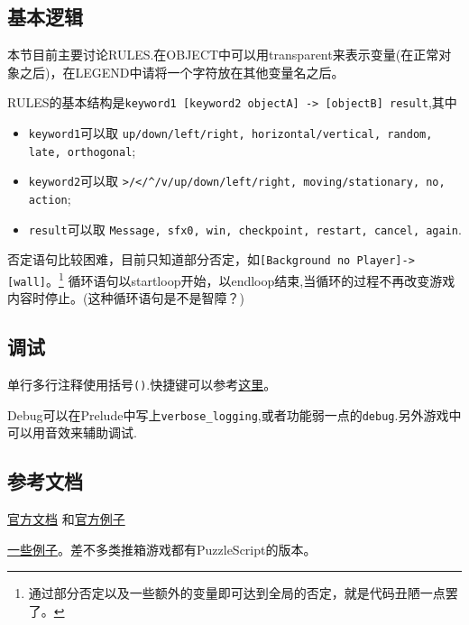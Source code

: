 \documentclass[11pt]{amsart}
\begin{document}
\subsection{基本逻辑}
本节目前主要讨论RULES.在OBJECT中可以用transparent来表示变量(在正常对象之后)，在LEGEND中请将一个字符放在其他变量名之后。

RULES的基本结构是\lstinline|keyword1 [keyword2 objectA] -> [objectB] result|,其中
\begin{itemize}
\item \lstinline|keyword1|可以取 \lstinline|up/down/left/right, horizontal/vertical, random, late, orthogonal|;
\item \lstinline|keyword2|可以取 \lstinline|>/</^/v/up/down/left/right, moving/stationary, no, action|;
\item \lstinline|result|可以取 \lstinline|Message, sfx0, win, checkpoint, restart, cancel, again|.
\end{itemize}
   

否定语句比较困难，目前只知道部分否定，如\lstinline|[Background no Player]->[wall]|。\footnote{通过部分否定以及一些额外的变量即可达到全局的否定，就是代码丑陋一点罢了。}
循环语句以startloop开始，以endloop结束,当循环的过程不再改变游戏内容时停止。(这种循环语句是不是智障？)
\subsection{调试}
单行多行注释使用括号\lstinline|()|.快捷键可以参考\href{https://pancelor.com/PuzzleScript/Documentation/keyboard_shortcuts.html}{这里}。

Debug可以在Prelude中写上\lstinline|verbose_logging|,或者功能弱一点的\lstinline|debug|.另外游戏中可以用音效来辅助调试.
\subsection{参考文档}
\href{https://www.puzzlescript.net/Documentation/documentation.html}{官方文档}
和\href{https://www.puzzlescript.net/Gallery/index.html}{官方例子}

\href{https://erich-friedman.github.io/published/interactive.html}{一些例子}。差不多类推箱游戏都有PuzzleScript的版本。
\end{document}
